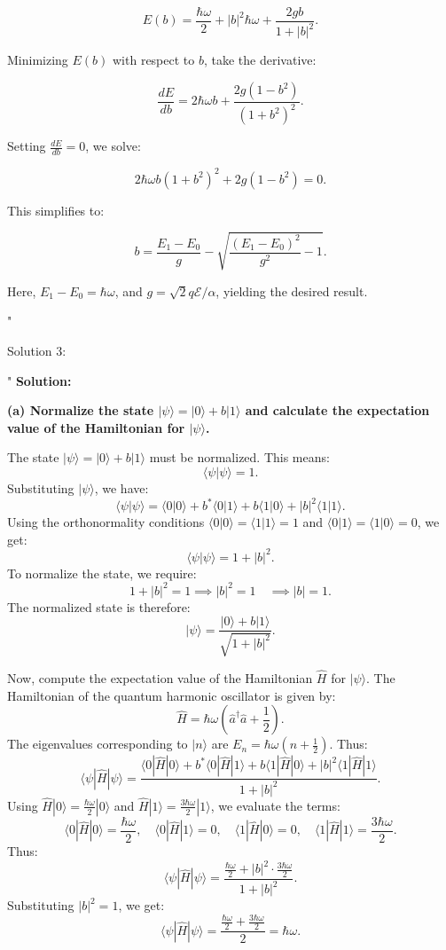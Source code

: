 \[
E(b) = \frac{\hbar \omega}{2} + |b|^2 \hbar \omega + \frac{2 g b}{1 + |b|^2}.
\]

Minimizing \(E(b)\) with respect to \(b\), take the derivative:

\[
\frac{dE}{db} = 2 \hbar \omega b + \frac{2g(1 - b^2)}{(1 + b^2)^2}.
\]

Setting \(\frac{dE}{db} = 0\), we solve:

\[
2 \hbar \omega b (1 + b^2)^2 + 2g(1 - b^2) = 0.
\]

This simplifies to:

\[
b = \frac{E_1 - E_0}{g} - \sqrt{\frac{(E_1 - E_0)^2}{g^2} - 1}.
\]

Here, \(E_1 - E_0 = \hbar \omega\), and \(g = \sqrt{2} q \mathcal{E}/\alpha\), yielding the desired result.

"

Solution 3:

"
\textbf{Solution:}

\textbf{(a) Normalize the state \(|\psi\rangle = |0\rangle + b |1\rangle\) and calculate the expectation value of the Hamiltonian for \(|\psi\rangle\).}

The state \(|\psi\rangle = |0\rangle + b |1\rangle\) must be normalized. This means:
\[
\langle \psi | \psi \rangle = 1.
\]
Substituting \(|\psi\rangle\), we have:
\[
\langle \psi | \psi \rangle = \langle 0 | 0 \rangle + b^* \langle 0 | 1 \rangle + b \langle 1 | 0 \rangle + |b|^2 \langle 1 | 1 \rangle.
\]
Using the orthonormality conditions \(\langle 0 | 0 \rangle = \langle 1 | 1 \rangle = 1\) and \(\langle 0 | 1 \rangle = \langle 1 | 0 \rangle = 0\), we get:
\[
\langle \psi | \psi \rangle = 1 + |b|^2.
\]
To normalize the state, we require:
\[
1 + |b|^2 = 1 \implies |b|^2 = 1 \quad \implies |b| = 1.
\]
The normalized state is therefore:
\[
|\psi\rangle = \frac{|0\rangle + b |1\rangle}{\sqrt{1 + |b|^2}}.
\]

Now, compute the expectation value of the Hamiltonian \(\hat{H}\) for \(|\psi\rangle\). The Hamiltonian of the quantum harmonic oscillator is given by:
\[
\hat{H} = \hbar\omega \left(\hat{a}^\dagger \hat{a} + \frac{1}{2}\right).
\]
The eigenvalues corresponding to \(|n\rangle\) are \(E_n = \hbar\omega\left(n + \frac{1}{2}\right)\). Thus:
\[
\langle \psi | \hat{H} | \psi \rangle = \frac{\langle 0 | \hat{H} | 0 \rangle + b^* \langle 0 | \hat{H} | 1 \rangle + b \langle 1 | \hat{H} | 0 \rangle + |b|^2 \langle 1 | \hat{H} | 1 \rangle}{1 + |b|^2}.
\]
Using \(\hat{H} |0\rangle = \frac{\hbar\omega}{2} |0\rangle\) and \(\hat{H} |1\rangle = \frac{3\hbar\omega}{2} |1\rangle\), we evaluate the terms:
\[
\langle 0 | \hat{H} | 0 \rangle = \frac{\hbar\omega}{2}, \quad \langle 0 | \hat{H} | 1 \rangle = 0, \quad \langle 1 | \hat{H} | 0 \rangle = 0, \quad \langle 1 | \hat{H} | 1 \rangle = \frac{3\hbar\omega}{2}.
\]
Thus:
\[
\langle \psi | \hat{H} | \psi \rangle = \frac{\frac{\hbar\omega}{2} + |b|^2 \cdot \frac{3\hbar\omega}{2}}{1 + |b|^2}.
\]
Substituting \(|b|^2 = 1\), we get:
\[
\langle \psi | \hat{H} | \psi \rangle = \frac{\frac{\hbar\omega}{2} + \frac{3\hbar\omega}{2}}{2} = \hbar\omega.
\]

